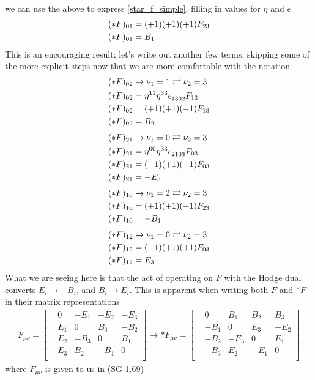%
we can use the above to express \ref{star_f_simple}, filling in values for $\eta$ and $\epsilon$
%
\begin{align}
	&(\ast F)_{0 1} = (+1) (+1) (+1) F_{23} \notag \\
	&(\ast F)_{0 1} = B_1
\end{align}
%
This is an encouraging result; let's write out another few terms, skipping some of the more explicit steps now that we are more comfortable with the notation
%
\begin{align}
	&(\ast F)_{0 2} \rightarrow \nu_1 = 1 \rightleftarrows \nu_2 = 3  \notag \\
	&(\ast F)_{0 2} = \eta\indices{^{11}}  \eta\indices{^{33}} \epsilon\indices{_{1302}} F_{13}  \notag \\
	&(\ast F)_{0 2} = (+1) (+1) (-1) F_{13}  \notag \\
	&(\ast F)_{0 2} = B_2
\end{align}
%
\begin{align}
	&(\ast F)_{2 1} \rightarrow \nu_1 = 0 \rightleftarrows \nu_2 = 3  \notag \\
	&(\ast F)_{2 1} = \eta\indices{^{00}}  \eta\indices{^{33}} \epsilon\indices{_{2103}} F_{03}  \notag \\
	&(\ast F)_{2 1} = (-1) (+1) (-1) F_{03}  \notag \\
	&(\ast F)_{2 1} = -E_3
\end{align}
%
\begin{align}
	&(\ast F)_{1 0} \rightarrow \nu_1 = 2 \rightleftarrows \nu_2 = 3  \notag \\
	&(\ast F)_{1 0} = (+1) (+1) (-1) F_{23}  \notag \\
	&(\ast F)_{1 0} = -B_1
\end{align}
%
\begin{align}
	&(\ast F)_{1 2} \rightarrow \nu_1 = 0 \rightleftarrows \nu_2 = 3  \notag \\
	&(\ast F)_{1 2} = (-1) (+1) (+1) F_{03}  \notag \\
	&(\ast F)_{1 2} = E_3
\end{align}
%
What we are seeing here is that the act of operating on $F$ with the Hodge dual converts $E_i \rightarrow -B_i$, and $B_i \rightarrow E_i$. This is apparent when writing both $F$ and $\ast F$ in their matrix representations
%
\begin{align}
	F_{\mu\nu} = \begin{bmatrix}
		&0   &-E_1 &-E_2 &-E_3 \\ 
		&E_1 &0    &B_3  &-B_2 \\
		&E_2 &-B_3 &0    &B_1  \\
		&E_3 &B_2  &-B_1 &0    \\
	\end{bmatrix} 
	\rightarrow
	\ast F_{\mu\nu} = \begin{bmatrix}
	&0   &B_1 &B_2 &B_3 \\ 
	&-B_1 &0    &E_3  &-E_2 \\
	&-B_2 &-E_3 &0    &E_1  \\
	&-B_3 &E_2  &-E_1 &0    \\
	\end{bmatrix}
\end{align}	
%
where $F_{\mu\nu}$ is given to us in (SG 1.69)


